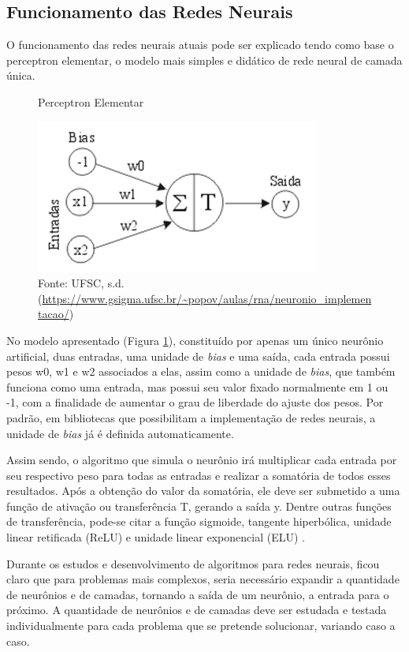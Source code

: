\subsection{Funcionamento das Redes Neurais}

\indent
\par O funcionamento das redes neurais atuais pode ser explicado tendo como base o perceptron elementar, o modelo mais simples e didático de rede neural de camada única.

\begin{figure}[H]
    \centering
    \caption{Perceptron Elementar}
    \includegraphics[width=0.6\linewidth]{Imagens/perceptron.png}
    \caption*{Fonte: UFSC, s.d. (\url{https://www.gsigma.ufsc.br/~popov/aulas/rna/neuronio_implementacao/})}
    \label{perceptron}
\end{figure}

\par No modelo apresentado (Figura \ref{perceptron}), constituído por apenas um único neurônio artificial, duas entradas, uma unidade de \textit{bias} e uma saída, cada entrada possui pesos w0, w1 e w2 associados a elas, assim como a unidade de \textit{bias}, que também funciona como uma entrada, mas possui seu valor fixado normalmente em 1 ou -1, com a finalidade de aumentar o grau de liberdade do ajuste dos pesos. Por padrão, em bibliotecas que possibilitam a implementação de redes neurais, a unidade de \textit{bias} já é definida automaticamente.

\par Assim sendo, o algoritmo que simula o neurônio irá multiplicar cada entrada por seu respectivo peso para todas as entradas e realizar a somatória de todos esses resultados. Após a obtenção do valor da somatória, ele deve ser submetido a uma função de ativação ou transferência T, gerando a saída y. Dentre outras funções de transferência, pode-se citar a função sigmoide, tangente hiperbólica, unidade linear retificada (ReLU) e unidade linear exponencial (ELU) \cite{Facure2017}.

\par Durante os estudos e desenvolvimento de algoritmos para redes neurais, ficou claro que para problemas mais complexos, seria necessário expandir a quantidade de neurônios e de camadas, tornando a saída de um neurônio, a entrada para o próximo. A quantidade de neurônios e de camadas deve ser estudada e testada individualmente para cada problema que se pretende solucionar, variando caso a caso.

